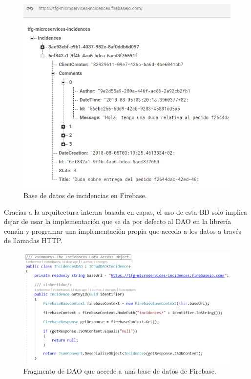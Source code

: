 \documentclass[11pt,spanish,listoffigures]{tfgetsinf}
\begin{document}
\begin{figure}[h]
\centering
\includegraphics[scale=0.85]{Firebase}
\caption{Base de datos de incidencias en Firebase.}
\end{figure}

Gracias a la arquitectura interna basada en capas, el uso de esta BD solo implica dejar de usar la implementación que se da por defecto al DAO en la librería común y programar una implementación propia que acceda a los datos a través de llamadas HTTP.

\begin{figure}[h]
\centering
\includegraphics[scale=0.8]{IncidencesDAO}
\caption{Fragmento de DAO que accede a una base de datos de Firebase.}
\end{figure}
\end{document}
